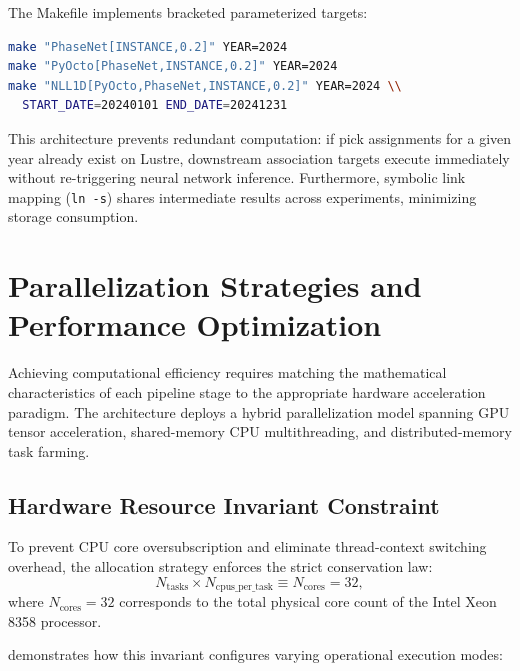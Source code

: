 The Makefile implements bracketed parameterized targets:
\begin{lstlisting}[language=bash,basicstyle=\scriptsize\ttfamily]
make "PhaseNet[INSTANCE,0.2]" YEAR=2024
make "PyOcto[PhaseNet,INSTANCE,0.2]" YEAR=2024
make "NLL1D[PyOcto,PhaseNet,INSTANCE,0.2]" YEAR=2024 \\
  START_DATE=20240101 END_DATE=20241231
\end{lstlisting}

This architecture prevents redundant computation: if pick
assignments for a given year already exist on Lustre, downstream
association targets execute immediately without re-triggering neural
network inference. Furthermore, symbolic link mapping (\texttt{ln
-s}) shares intermediate results across experiments, minimizing
storage consumption.

\section{Parallelization Strategies and Performance Optimization}
\label{sec:parallelization}

Achieving computational efficiency requires matching the
mathematical characteristics of each pipeline stage to the
appropriate hardware acceleration paradigm. The architecture deploys
a hybrid parallelization model spanning \ac{GPU} tensor acceleration,
shared-memory \ac{CPU} multithreading, and distributed-memory task farming.

\subsection{Hardware Resource Invariant Constraint}
To prevent \ac{CPU} core oversubscription and eliminate thread-context
switching overhead, the allocation strategy enforces the strict
conservation law:
\begin{equation}
  N_{\mathrm{tasks}} \times N_{\mathrm{cpus\_per\_task}} \equiv
  N_{\mathrm{cores}} = \num{32},
\end{equation}
where $N_{\mathrm{cores}} = \num{32}$ corresponds to the total physical
core count of the Intel Xeon 8358 processor.

 demonstrates how this invariant
configures varying operational execution modes:

